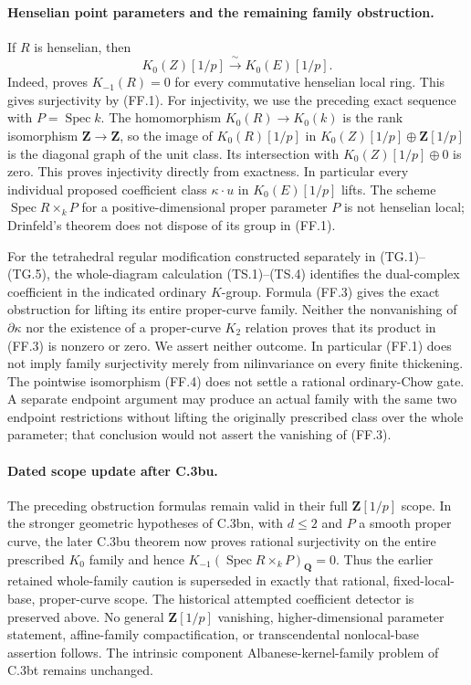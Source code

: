 \paragraph{Henselian point parameters and the remaining family obstruction.}
If $R$ is henselian, then
\begin{equation}
 K_0(Z)[1/p]\xrightarrow{\ \sim\ }K_0(E)[1/p].
 \tag{FF.4}
\end{equation}
Indeed, \citet[Theorem 3.7 and Remark (ii), author p.~8]
{frDrinfeld2004Tate} proves $K_{-1}(R)=0$ for every commutative henselian
local ring.  This gives surjectivity by (FF.1).  For injectivity, we
use the preceding exact sequence with $P=\operatorname{Spec}k$.
The homomorphism $K_0(R)\to K_0(k)$ is the rank isomorphism
$\mathbf Z\to\mathbf Z$, so the image of $K_0(R)[1/p]$ in
$K_0(Z)[1/p]\oplus\mathbf Z[1/p]$ is the diagonal graph of the unit
class.  Its intersection with $K_0(Z)[1/p]\oplus0$ is zero.
This proves injectivity directly from exactness.  In particular every
individual proposed coefficient class $\kappa\cdot u$ in $K_0(E)[1/p]$
lifts.  The scheme $\operatorname{Spec}R\times_kP$ for a positive-dimensional
proper parameter $P$ is not henselian local; Drinfeld's theorem does
not dispose of its group in (FF.1).

For the tetrahedral regular modification constructed separately in
(TG.1)--(TG.5), the whole-diagram calculation (TS.1)--(TS.4) identifies
the dual-complex coefficient in the indicated ordinary $K$-group.
Formula (FF.3) gives the exact obstruction for lifting its entire
proper-curve family.  Neither the nonvanishing of $\partial\kappa$ nor the existence
of a proper-curve $K_2$ relation proves that its product in (FF.3) is
nonzero or zero.  We assert neither outcome.  In particular (FF.1)
does not imply family surjectivity merely from nilinvariance on every
finite thickening.  The pointwise isomorphism (FF.4) does not settle a
rational ordinary-Chow gate.  A separate endpoint argument may produce
an actual family with the same two endpoint restrictions without
lifting the originally prescribed class over the whole parameter;
that conclusion would not assert the vanishing of (FF.3).


\paragraph{Dated scope update after C.3bu.}
The preceding obstruction formulas remain valid in their full
$\mathbf Z[1/p]$ scope.  In the stronger geometric hypotheses of
C.3bn, with $d\leq2$ and $P$ a smooth proper curve, the later
C.3bu theorem now proves rational surjectivity on the entire
prescribed $K_0$ family and hence
$K_{-1}(\operatorname{Spec}R\times_kP)_{\mathbf Q}=0$.
Thus the earlier retained whole-family caution is superseded in
exactly that rational, fixed-local-base, proper-curve scope.
The historical attempted coefficient detector is preserved above.
No general $\mathbf Z[1/p]$ vanishing, higher-dimensional parameter
statement, affine-family compactification, or transcendental
nonlocal-base assertion follows.  The intrinsic component
Albanese-kernel-family problem of C.3bt remains unchanged.
